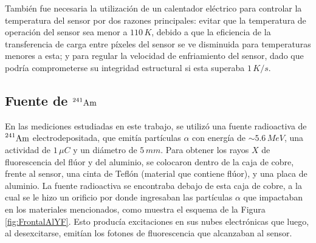 También fue necesaria la utilización de un calentador eléctrico para controlar la temperatura del sensor por dos razones principales: evitar que la temperatura de operación del sensor sea menor a $110\,\si{K}$, debido a que la eficiencia de la transferencia de carga entre píxeles del sensor se ve disminuida para temperaturas menores a esta; y para regular la velocidad de enfriamiento del sensor, dado que podría comprometerse su integridad estructural si esta superaba $1\,\si{K/s}$.

\subsection{Fuente de \texorpdfstring{$\prescript{241}{}{\mbox{Am}}$}{Am241}}
\noindent En las mediciones estudiadas en este trabajo, se utilizó una fuente radioactiva de $\prescript{241}{}{\mbox{Am}}$ electrodepositada, que emitía partículas $\alpha$ con energía de $\sim 5.6\,\si{MeV}$, una actividad de $1\,\si{\mu C}$ y un diámetro de $5\,\si{mm}$. 
Para obtener los rayos $X$ de fluorescencia del flúor y del aluminio, se colocaron dentro de la caja de cobre, frente al sensor, una cinta de Teflón (material que contiene flúor), y una placa de aluminio. La fuente radioactiva se encontraba debajo de esta caja de cobre, a la cual se le hizo un orificio por donde ingresaban las partículas $\alpha$ que impactaban en los materiales mencionados, como muestra el esquema de la Figura \ref{fig:FrontalAlYF}. Esto producía excitaciones en sus nubes electrónicas que luego, al desexcitarse, emitían los fotones de fluorescencia que alcanzaban al sensor.
